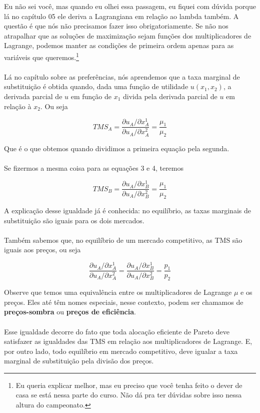 \documentclass[a4paper,11pt,oneside]{book}
\theoremstyle{definition}
\theoremstyle{break}
\begin{document}
Eu não sei você, mas quando eu olhei essa passagem, eu fiquei com dúvida porque lá no capítulo 05 ele deriva a Lagrangiana em relação ao lambda também. A questão é que nós não precisamos fazer isso obrigatoriamente. Se não nos atrapalhar que as soluções de maximização sejam funções dos multiplicadores de Lagrange, podemos manter as condições de primeira ordem apenas para as variáveis que queremos.\footnote{Eu queria explicar melhor, mas eu preciso que você tenha feito o dever de casa se está nessa parte do curso. Não dá pra ter dúvidas sobre isso nessa altura do campeonato.}
\\
\\
Lá no capítulo sobre as preferências, nós aprendemos que a taxa marginal de substituição é obtida quando, dada uma função de utilidade $u(x_1,x_2)$, a derivada parcial de $u$ em função de $x_{1}$ divida pela derivada parcial de $u$ em relação à $x_{2}$. Ou seja

$$TMS_{A} = \frac{\partial u_A / \partial x_{A}^1 }{\partial u_A / \partial x_{A}^2} = \frac{\mu_{1} }{ \mu_{2} }$$

Que é o que obtemos quando dividimos a primeira equação pela segunda.
\\
\\
Se fizermos a mesma coisa para as equações 3 e 4, teremos

$$TMS_{B} = \frac{\partial u_A / \partial x_{B}^1 }{\partial u_A / \partial x_{B}^2} = \frac{\mu_{1} }{ \mu_{2} }$$

A explicação desse igualdade já é conhecida: no equilíbrio, as taxas marginais de substituição são iguais para os dois mercados.
\\
\\
Também sabemos que, no equilíbrio de um mercado competitivo, as TMS são iguais aos preços, ou seja

$$	\frac{\partial u_A / \partial x_{A}^1 }{\partial u_A / \partial x_{A}^2} = \frac{\partial u_A / \partial x_{B}^1 }{\partial u_A / \partial x_{B}^2} = \frac{ p_{1} }{ p_{2} } $$

Observe que temos uma equivalência entre os multiplicadores de Lagrange $\mu$ e os preços. Eles até têm nomes especiais, nesse contexto, podem ser chamamos de \textbf{preços-sombra} ou \textbf{preços de eficiência}.
\\
\\
Esse igualdade decorre do fato que toda alocação eficiente de Pareto deve satisfazer as igualdades das TMS em relação aos multiplicadores de Lagrange. E, por outro lado, todo equilíbrio em mercado competitivo, deve igualar a taxa marginal de substituição pela divisão dos preços.
\end{document}
